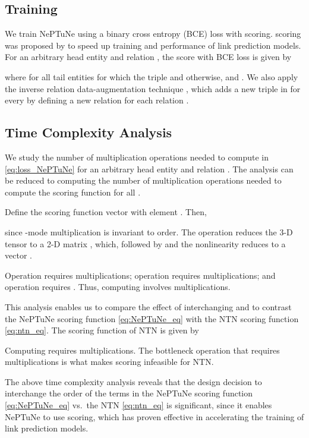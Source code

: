 \documentclass[11pt]{article}
\begin{document}
\subsection{Training}

We train NePTuNe using a binary cross entropy (BCE) loss with  scoring.
 scoring was proposed by \cite{dettmers2018convolutional} to speed up training and performance of link prediction models. For an arbitrary head entity  and relation , the  score with BCE loss is given by

where  for all tail entities  for which the triple  and  otherwise, and . 
We also apply the inverse relation data-augmentation technique \cite{dettmers2018convolutional,lacroix2018canonical}, which adds a new triple  in  for every  by defining a new relation  for each relation .

\subsection{Time Complexity Analysis}
\label{complexity}

We study the number of multiplication operations needed to compute  in \eqref{eq:loss_NePTuNe} for an arbitrary head entity  and relation .  
The analysis can be reduced to computing the number of multiplication operations needed to compute the scoring function  for all .

Define the scoring function vector 
 with  element . Then,

since -mode multiplication is invariant to order. 
The operation  reduces the 3-D tensor  to a 2-D matrix , which, followed by  and the nonlinearity reduces  to a vector .

Operation  requires  multiplications; operation  requires  multiplications; and operation  requires . 
Thus, computing  involves  multiplications.

This analysis enables us to compare the effect of interchanging  and  to contrast the NePTuNe scoring function \eqref{eq:NePTuNe_eq} with the NTN scoring function \eqref{eq:ntn_eq}. 
The scoring function of NTN is given by

Computing  requires  multiplications. 
The bottleneck operation  that requires  multiplications is what makes  scoring infeasible for NTN.

The above time complexity analysis reveals that the design decision to interchange the order of the terms in the NePTuNe scoring function \eqref{eq:NePTuNe_eq} vs.\ the NTN \eqref{eq:ntn_eq} is significant, since it enables NePTuNe to use  scoring, which has proven effective in accelerating the training of link prediction models.
\end{document}
